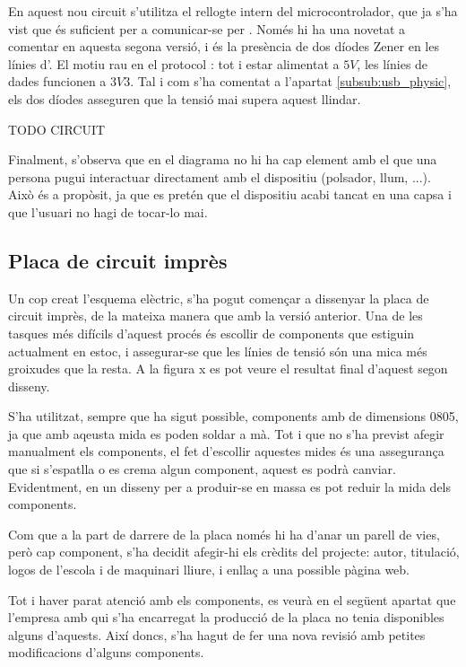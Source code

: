 En aquest nou circuit s'utilitza el rellogte intern del microcontrolador, que
ja s'ha vist que és suficient per a comunicar-se per . Només hi ha
una novetat a comentar en aquesta segona versió, i és la presència de dos
díodes Zener en les línies d'. El motiu rau en el protocol :
tot i estar alimentat a $5V$, les línies de dades funcionen a $3V3$. Tal i com
s'ha comentat a l'apartat \ref{subsub:usb_physic}, els dos díodes asseguren
que la tensió mai supera aquest llindar.

TODO CIRCUIT

Finalment, s'observa que en el diagrama no hi ha cap element amb el que una
persona pugui interactuar directament amb el dispositiu (polsador, llum, ...).
Això és a propòsit, ja que es pretén que el dispositiu acabi tancat en una capsa
i que l'usuari no hagi de tocar-lo mai.

\subsection{Placa de circuit imprès}

Un cop creat l'esquema elèctric, s'ha pogut començar a dissenyar la placa de
circuit imprès, de la mateixa manera que amb la versió anterior. Una de les
tasques més difícils d'aquest procés és escollir  de components
que estiguin actualment en estoc, i assegurar-se que les línies de tensió
són una mica més groixudes que la resta. A la figura x es pot veure el resultat
final d'aquest segon disseny.

S'ha utilitzat,
sempre que ha sigut possible, components amb  de dimensions 0805,
ja que amb aqeusta mida es poden soldar a mà. Tot i que no s'ha previst afegir
manualment els components, el fet d'escollir aquestes mides és una assegurança
que si s'espatlla o es crema algun component, aquest es podrà canviar.
Evidentment, en un disseny per a produir-se en massa es pot reduir la mida dels
components.

Com que a la part de darrere de la placa només hi ha d'anar un parell de vies,
però cap component, s'ha decidit afegir-hi els crèdits del projecte: autor,
titulació, logos de l'escola i de maquinari lliure, i enllaç a una possible
pàgina web.

Tot i haver parat atenció amb els components, es veurà en el següent apartat que
l'empresa amb qui s'ha encarregat la producció de la placa no tenia disponibles
alguns d'aquests. Així doncs, s'ha hagut de fer una nova revisió amb petites
modificacions d'alguns components.

